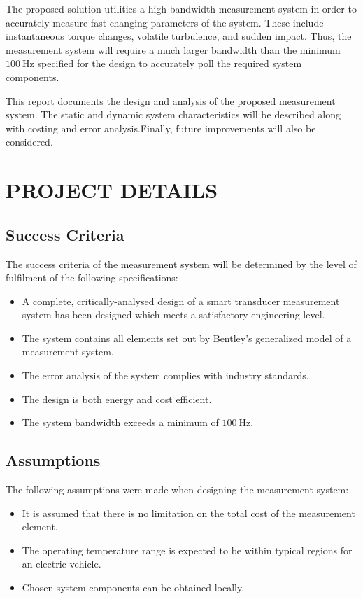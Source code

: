 \documentclass[10pt,twocolumn]{witseiepaper}
\begin{document}
The proposed solution utilities a high-bandwidth measurement system in order to accurately measure fast changing parameters of the system. These include instantaneous torque changes, volatile turbulence, and sudden impact. Thus, the measurement system will require a much larger bandwidth than the minimum $100~\mathrm{Hz}$ specified for the design to accurately poll the required system components.

This report documents the design and analysis of the proposed measurement system. The static and dynamic system characteristics will be described along with costing and error analysis.Finally, future improvements will also be considered.

\section{PROJECT DETAILS}

\subsection{Success Criteria}

The success criteria of the measurement system will be determined by the level of fulfilment of the following specifications:

\begin{itemize}
	\item A complete, critically-analysed design of a smart transducer measurement system has been designed which meets a satisfactory engineering level.
	\item The system contains all elements set out by Bentley's generalized model of a measurement system.
	\item The error analysis of the system complies with industry standards.
	\item The design is both energy and cost efficient.
	\item The system bandwidth exceeds a minimum of $100~\mathrm{Hz}$.
\end{itemize}

\subsection{Assumptions}

The following assumptions were made when designing the measurement system:

\begin{itemize}
	\item It is assumed that there is no limitation on the total cost of the measurement element.
	\item The operating temperature range is expected to be within typical regions for an electric vehicle.
	\item Chosen system components can be obtained locally.
\end{itemize}
\end{document}
